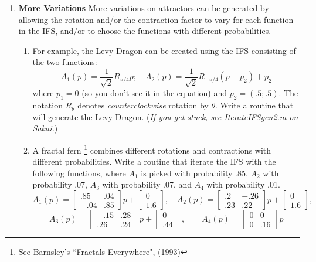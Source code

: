 \documentclass[12pt]{article}
\begin{document}
\begin{enumerate}
\begin{enumerate}
  \end{enumerate}
  \item {\bf More Variations} 
  \quad  More variations on attractors can be generated by allowing the rotation and/or the contraction factor to vary for each function in the IFS, and/or to 
  choose the functions with different probabilities.
  \begin{enumerate}
  \item 
  For example, the Levy Dragon can be created using the IFS consisting of the two functions:
  $$ A_1 (p) = \frac{1}{\sqrt{2}} R_{\pi/4} p ; \quad A_2(p) = \frac{1}{\sqrt{2}}R_{-\pi/4}(p - p_2) + p_2 $$
  where $p_1 = 0$ (so you don't see it in the equation) and $p_2 = (.5; .5)$.  The notation $R_{\theta}$ denotes {\it counterclockwise} rotation by $\theta$.
  Write a routine that will generate the Levy Dragon. ({\it If you get stuck, see IterateIFSgen2.m on Sakai.}) 
  \item A fractal fern \footnote{See Barnsley's ``Fractals Everywhere", (1993) } combines different rotations and contractions with different probabilities.
  Write a routine that iterate the IFS with the following functions, where $A_1$ is picked with probability .85, $A_2$ with probability .07, $A_3$ with probability 
  .07, and $A_4$ with probability .01.
  $$ A_1(p) = \left[\begin{array}{cc}.85 & .04 \\-.04 & .85\end{array}\right] p + \left[\begin{array}{c}0 \\1.6\end{array}\right] , \quad
  A_2(p) = \left[\begin{array}{cc}.2 & -.26 \\ .23 & .22 \end{array}\right] p + \left[\begin{array}{c}0 \\1.6\end{array}\right] , $$
  $$
   A_3(p) = \left[\begin{array}{cc} -.15 & .28 \\ .26 & .24 \end{array}\right] p + \left[\begin{array}{c}0 \\.44\end{array}\right] , \quad \quad
      A_4(p) = \left[\begin{array}{cc}  0 & 0  \\  0  &  .16 \end{array}\right] p
$$
\end{enumerate}
\end{enumerate}
\end{document}
